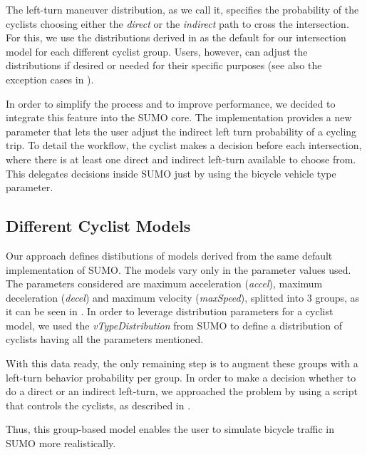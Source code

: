 The left-turn maneuver distribution, as we call it, specifies the probability of the cyclists choosing either the \textit{direct} or the \textit{indirect} path to cross the intersection.
For this, we use the distributions derived in  as the default for our intersection model for each different cyclist group.
Users, however, can adjust the distributions if desired or needed for their specific purposes (see also the exception cases in ).

In order to simplify the process and to improve performance, we decided to integrate this feature into the SUMO core.
The implementation provides a new parameter that lets the user adjust the indirect left turn probability of a cycling trip.
To detail the workflow, the cyclist makes a decision before each intersection, where there is at least one direct and indirect left-turn available to choose from.
This delegates decisions inside SUMO just by using the bicycle vehicle type parameter.

\subsection{Different Cyclist Models}
\label{subsec:different_cyclist_models}

Our approach defines distibutions of models derived from the same default implementation of SUMO.
The models vary only in the parameter values used.
The parameters considered are maximum acceleration (\textit{accel}), maximum deceleration (\textit{decel}) and maximum velocity (\textit{maxSpeed}), splitted into \num{3} groups, as it can be seen in .
In order to leverage distribution parameters for a cyclist model, we used the \textit{vTypeDistribution} from SUMO to define a distribution of cyclists having all the parameters mentioned.

With this data ready, the only remaining step is to augment these groups with a left-turn behavior probability per group.
In order to make a decision whether to do a direct or an indirect left-turn, we approached the problem by using a script that controls the cyclists, as described in .

Thus, this group-based model enables the user to simulate bicycle traffic in SUMO more realistically.

